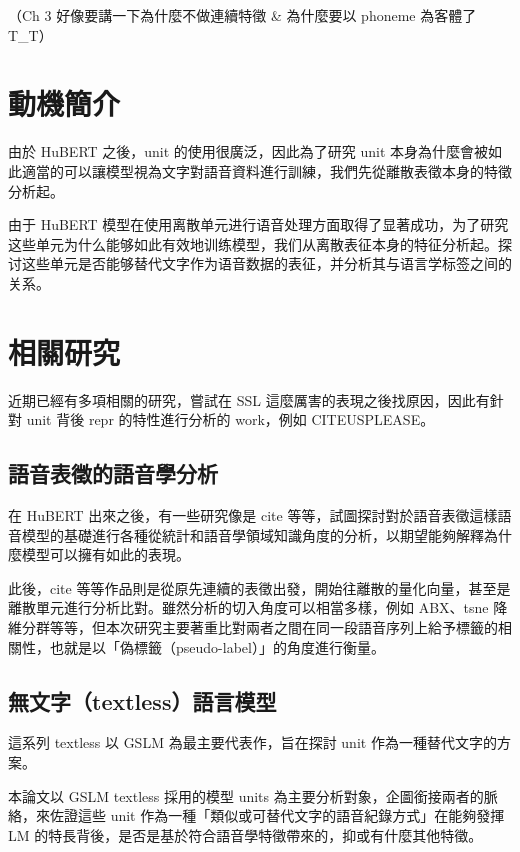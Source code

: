 
（Ch 3 好像要講一下為什麼不做連續特徵 \& 為什麼要以 phoneme 為客體了 T\_T） 
\section{動機簡介}  %



由於 HuBERT 之後，unit 的使用很廣泛，因此為了研究 unit 本身為什麼會被如此適當的可以讓模型視為文字對語音資料進行訓練，我們先從離散表徵本身的特徵分析起。 

由于 HuBERT 模型在使用离散单元进行语音处理方面取得了显著成功，为了研究这些单元为什么能够如此有效地训练模型，我们从离散表征本身的特征分析起。探讨这些单元是否能够替代文字作为语音数据的表征，并分析其与语言学标签之间的关系。 


\section{相關研究}
近期已經有多項相關的研究，嘗試在 SSL 這麼厲害的表現之後找原因，因此有針對 unit 背後 repr 的特性進行分析的 work，例如 CITEUSPLEASE。 

\subsection{語音表徵的語音學分析}
在 HuBERT 出來之後，有一些研究像是 cite 等等，試圖探討對於語音表徵這樣語音模型的基礎進行各種從統計和語音學領域知識角度的分析，以期望能夠解釋為什麼模型可以擁有如此的表現。

此後，cite 等等作品則是從原先連續的表徵出發，開始往離散的量化向量，甚至是離散單元進行分析比對。雖然分析的切入角度可以相當多樣，例如 ABX、tsne 降維分群等等，但本次研究主要著重比對兩者之間在同一段語音序列上給予標籤的相關性，也就是以「偽標籤（pseudo-label）」的角度進行衡量。

\subsection{無文字（textless）語言模型}

這系列 textless 以 GSLM 為最主要代表作，旨在探討 unit 作為一種替代文字的方案。

本論文以 GSLM textless 採用的模型 units 為主要分析對象，企圖銜接兩者的脈絡，來佐證這些 unit 作為一種「類似或可替代文字的語音紀錄方式」在能夠發揮 LM 的特長背後，是否是基於符合語音學特徵帶來的，抑或有什麼其他特徵。



